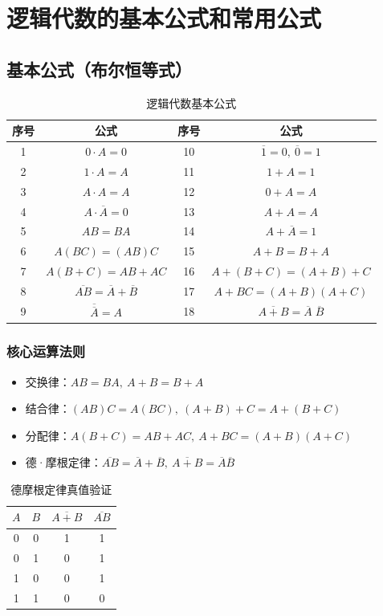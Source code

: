 \section{逻辑代数的基本公式和常用公式}
\subsection{基本公式（布尔恒等式）}
\begin{table}[!htbp]
    \centering
    \caption{逻辑代数基本公式}
    \begin{tabular}{|c|c|c|c|}
        \hline
        序号 & 公式 & 序号 & 公式 \\
        \hline
        1  & $0 \cdot A = 0$        & 10 & $\overline{1}=0,\ \overline{0}=1$ \\
        2  & $1 \cdot A = A$        & 11 & $1 + A = 1$ \\
        3  & $A \cdot A = A$        & 12 & $0 + A = A$ \\
        4  & $A \cdot \overline{A} = 0$ & 13 & $A + A = A$ \\
        5  & $AB=BA$                & 14 & $A + \overline{A} = 1$ \\
        6  & $A(BC)=(AB)C$          & 15 & $A+B=B+A$ \\
        7  & $A(B+C)=AB+AC$         & 16 & $A+(B+C)=(A+B)+C$ \\
        8  & $\overline{AB}=\overline{A}+\overline{B}$ & 17 & $A+BC=(A+B)(A+C)$ \\
        9  & $\overline{\overline{A}}=A$ & 18 & $\overline{A+B}=\overline{A}\;\overline{B}$ \\
        \hline
    \end{tabular}
\end{table}

\subsubsection{核心运算法则}
\begin{itemize}
    \item 交换律：$AB=BA,\ A+B=B+A$
    \item 结合律：$(AB)C=A(BC),\ (A+B)+C=A+(B+C)$
    \item 分配律：$A(B+C)=AB+AC,\ A+BC=(A+B)(A+C)$
    \item 德·摩根定律：$\overline{AB}=\overline{A}+\overline{B},\ \overline{A+B}=\overline{A}\overline{B}$
\end{itemize}

\begin{table}[!htbp]
    \centering
    \caption{德摩根定律真值验证}
    \begin{tabular}{|c|c|c|c|}
        \hline
        $A$ & $B$ & $\overline{A+B}$ & $\overline{AB}$ \\
        \hline
        0&0&1&1\\0&1&0&1\\1&0&0&1\\1&1&0&0\\
        \hline
    \end{tabular}
\end{table}

